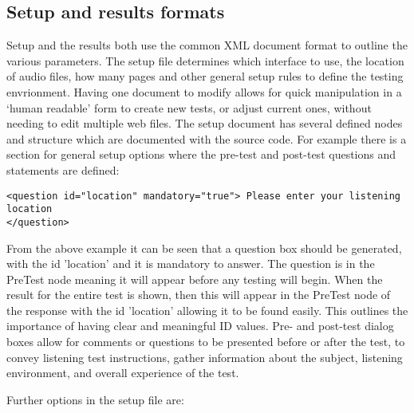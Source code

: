\documentclass{article}
\begin{document}

\subsection{Setup and results formats}\label{sec:setupresultsformats}

Setup and the results both use the common XML document format to outline the various parameters. The setup file determines which interface to use, the location of audio files, how many pages and other general setup rules to define the testing envrionment. Having one document to modify allows for quick manipulation in a `human readable' form to create new tests, or adjust current ones, without needing to edit multiple web files. %
The setup document has several defined nodes and structure which are documented with the source code. For example there is a section for general setup options where the pre-test and post-test questions and statements are defined:

\texttt{<question id="location" mandatory="true"> Please enter your listening location \\ </question>}

From the above example it can be seen that a question box should be generated, with the id 'location' and it is mandatory to answer. The question is in the PreTest node meaning it will appear before any testing will begin. When the result for the  entire test is shown, then this will appear in the PreTest node of the response with the id 'location' allowing it to be found easily. This outlines the importance of having clear and meaningful ID values. Pre- and post-test dialog boxes allow for comments or questions to be presented before or after the test, to convey listening test instructions, gather information about the subject, listening environment, and overall experience of the test.
 
Further options in the setup file are: 
\end{document}
